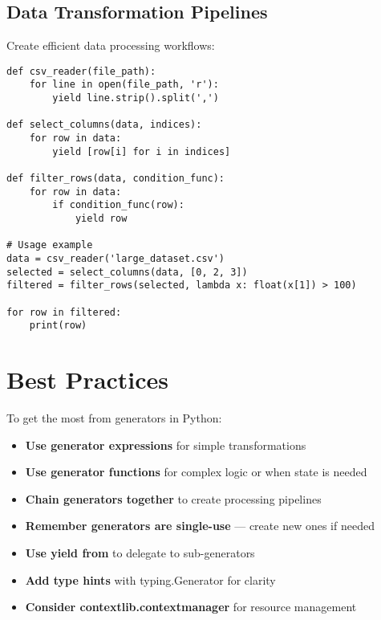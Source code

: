 \documentclass[12pt,letterpaper]{article}
\newenvironment{macterminal}{%
    \begin{mdframed}[
        linecolor=terminalFrame,
        backgroundcolor=terminalBg,
        roundcorner=5pt,
        skipabove=10pt,
        skipbelow=10pt,
        linewidth=1pt,
        innertopmargin=10pt, %
        frametitle={%
            \tikz[baseline=(current bounding box.east), outer sep=0pt]{
                \fill[red!80!black] (0,0) circle (5pt);
                \fill[yellow!80!black] (0.7,0) circle (5pt);
                \fill[green!70!black] (1.4,0) circle (5pt);
            }
        },
        frametitlealignment=\raggedright, %
        frametitleaboveskip=8pt, %
        frametitlebelowskip=0pt, %
    ]
}{%
    \end{mdframed}%
}
\begin{document}
\subsection{Data Transformation Pipelines}

Create efficient data processing workflows:

\begin{macterminal}
\begin{lstlisting}
def csv_reader(file_path):
    for line in open(file_path, 'r'):
        yield line.strip().split(',')

def select_columns(data, indices):
    for row in data:
        yield [row[i] for i in indices]

def filter_rows(data, condition_func):
    for row in data:
        if condition_func(row):
            yield row
            
# Usage example
data = csv_reader('large_dataset.csv')
selected = select_columns(data, [0, 2, 3])
filtered = filter_rows(selected, lambda x: float(x[1]) > 100)

for row in filtered:
    print(row)
\end{lstlisting}
\end{macterminal}

\section{Best Practices}

To get the most from generators in Python:

\begin{itemize}
    \item \textbf{\textcolor{pythonBlue}{Use generator expressions}} for simple transformations
    \item \textbf{\textcolor{pythonBlue}{Use generator functions}} for complex logic or when state is needed
    \item \textbf{\textcolor{pythonBlue}{Chain generators together}} to create processing pipelines
    \item \textbf{\textcolor{pythonBlue}{Remember generators are single-use}} — create new ones if needed
    \item \textbf{\textcolor{pythonBlue}{Use yield from}} to delegate to sub-generators
    \item \textbf{\textcolor{pythonBlue}{Add type hints}} with typing.Generator for clarity
    \item \textbf{\textcolor{pythonBlue}{Consider contextlib.contextmanager}} for resource management
\end{itemize}
\end{document}
